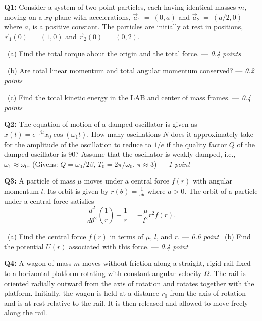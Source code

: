 \documentclass[a4paper,12pt]{article}
\begin{document}
\textbf{Q1:} Consider a system of two point particles, each having identical masses $m$, moving on a $xy$ plane with accelerations, $\vec a_{1}~=~(0,a)$ and $\vec a_{2}~=~(a/2,0)$ where $a$, is a positive constant. The particles are \underline{initially at rest} in positions, $\vec r_{1}(0)~=~(1,0)$ and $\vec r_{2}(0)~=~(0,2)$.

\vspace*{0.1cm}
~(a) Find the total torque about the origin and the total force. --- \textit{0.4 points}

~(b) Are total linear momentum and total angular momentum conserved? --- \textit{0.2 points}

~(c) Find the total kinetic energy in the LAB and center of mass frames. --- \textit{0.4 points}

\vspace*{0.25cm}
\textbf{Q2:} The equation of motion of a damped oscillator is given as $x(t)=e^{-\beta t}x_0\cos{\left(\omega_1 t\right)}$. How many oscillations $N$ does it approximately take for the amplitude of the oscillation to reduce to $1/e$ if the quality factor $Q$ of the damped oscillator is $90$? Assume that the oscillator is weakly damped, i.e., $\omega_1 \approx \omega_0$.
(Givens: $Q = \omega_0/2\beta$, $T_0=2\pi/\omega_0$, $\pi\approx 3$) --- \textit{1 point}

\vspace*{0.25cm}
\textbf{Q3:} A particle of mass $\mu$ moves under a central force $f(r)$ with angular momentum $l$. Its orbit is given by $r(\theta) = \frac{1}{a \theta}$ where $a > 0$. The orbit of a particle under a central force satisfies
\[
\frac{d^2}{d\theta^2}\left(\frac{1}{r}\right) + \frac{1}{r} = -\frac{\mu}{l^2} r^2 f(r).
\]

\vspace*{0.1cm}
~(a) Find the central force $f(r)$ in terms of $\mu$, $l$, and $r$. --- \textit{0.6 point}
~(b) Find the potential $U(r)$ associated with this force. --- \textit{0.4 point}

\vspace*{0.25cm}
\textbf{Q4:} A wagon of mass $m$ moves without friction along a straight, rigid rail fixed to a horizontal platform rotating with constant angular velocity $\Omega$.  
The rail is oriented radially outward from the axis of rotation and rotates together with the platform. Initially, the wagon is held at a distance $r_0$ from the axis of rotation and is at rest relative to the rail. It is then released and allowed to move freely along the rail.
\end{document}

